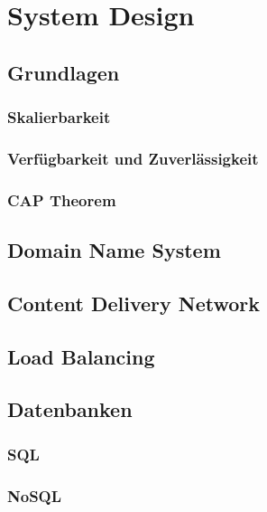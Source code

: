 \documentclass[../main.tex]{subfiles}
\begin{document}
	
	\section{System Design}
	\subsection{Grundlagen}
	\subsubsection{Skalierbarkeit}
	\clearpage
	
	\subsubsection{Verfügbarkeit und Zuverlässigkeit}
	\clearpage
	
	\subsubsection{CAP Theorem}
	\clearpage
	
	\subsection{Domain Name System}
	\clearpage
	
	\subsection{Content Delivery Network}
	\clearpage
	
	\subsection{Load Balancing}
	\clearpage
	
	\subsection{Datenbanken}
	\subsubsection{SQL}
	\clearpage
	
	\subsubsection{NoSQL}
	\clearpage
	
\end{document}
